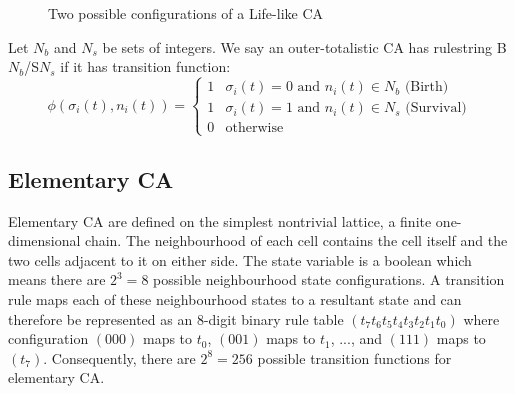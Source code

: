 \begin{figure}[!h]
  \centering
  \hfill
  \hfill
  \hfill\hfill
  \caption{Two possible configurations of a Life-like CA}
  \label{fig:two-moores}
\end{figure}

\begin{definition}
Let $N_b$ and $N_s$ be sets of integers. We say an outer-totalistic CA has rulestring \textnormal{B$N_b$/S$N_s$} if it has transition function:
\begin{equation}
  \phi(\sigma_i(t), n_i(t)) = 
  \begin{cases}
    1 & \sigma_i(t) = 0 \text{ and } n_i(t) \in N_b \text{  (Birth)}\\
    1 & \sigma_i(t) = 1 \text{ and } n_i(t) \in N_s \text{  (Survival)}\\
    0 & \text{otherwise}
  \end{cases}
\end{equation}
\label{def:bs-notation}
\end{definition}


\subsection{Elementary CA} 
Elementary CA are defined on the simplest nontrivial lattice, a finite one-dimensional chain. The neighbourhood of each cell contains the cell itself and the two cells adjacent to it on either side. The state variable is a boolean which means there are $2^3 = 8$ possible neighbourhood state configurations. A transition rule maps each of these neighbourhood states to a resultant state and can therefore be represented as an 8-digit binary rule table $(t_7t_6t_5t_4t_3t_2t_1t_0)$ where configuration $(000)$ maps to $t_0$, $(001)$ maps to $t_1$, ..., and $(111)$ maps to $(t_7)$. Consequently, there are $2^8=256$ possible transition functions for elementary CA.\\

